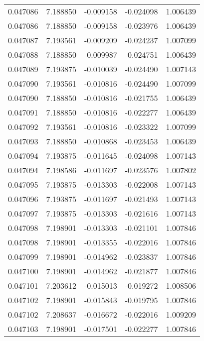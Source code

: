 \begin{tabular}{lrrrr}
0.047086    &  7.188850 & -0.009158 & -0.024098 &             1.006439 \\
0.047086    &  7.188850 & -0.009158 & -0.023976 &             1.006439 \\
0.047087    &  7.193561 & -0.009209 & -0.024237 &             1.007099 \\
0.047088    &  7.188850 & -0.009987 & -0.024751 &             1.006439 \\
0.047089    &  7.193875 & -0.010039 & -0.024490 &             1.007143 \\
0.047090    &  7.193561 & -0.010816 & -0.024490 &             1.007099 \\
0.047090    &  7.188850 & -0.010816 & -0.021755 &             1.006439 \\
0.047091    &  7.188850 & -0.010816 & -0.022277 &             1.006439 \\
0.047092    &  7.193561 & -0.010816 & -0.023322 &             1.007099 \\
0.047093    &  7.188850 & -0.010868 & -0.023453 &             1.006439 \\
0.047094    &  7.193875 & -0.011645 & -0.024098 &             1.007143 \\
0.047094    &  7.198586 & -0.011697 & -0.023576 &             1.007802 \\
0.047095    &  7.193875 & -0.013303 & -0.022008 &             1.007143 \\
0.047096    &  7.193875 & -0.011697 & -0.021493 &             1.007143 \\
0.047097    &  7.193875 & -0.013303 & -0.021616 &             1.007143 \\
0.047098    &  7.198901 & -0.013303 & -0.021101 &             1.007846 \\
0.047098    &  7.198901 & -0.013355 & -0.022016 &             1.007846 \\
0.047099    &  7.198901 & -0.014962 & -0.023837 &             1.007846 \\
0.047100    &  7.198901 & -0.014962 & -0.021877 &             1.007846 \\
0.047101    &  7.203612 & -0.015013 & -0.019272 &             1.008506 \\
0.047102    &  7.198901 & -0.015843 & -0.019795 &             1.007846 \\
0.047102    &  7.208637 & -0.016672 & -0.022016 &             1.009209 \\
0.047103    &  7.198901 & -0.017501 & -0.022277 &             1.007846 \\

\end{tabular}
